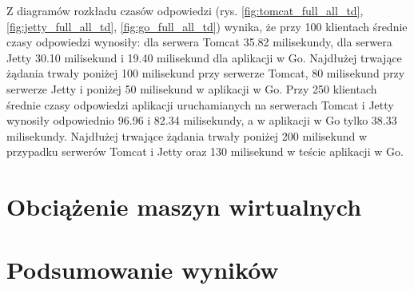 Z diagramów rozkładu czasów odpowiedzi (rys. \ref{fig:tomcat_full_all_td}, \ref{fig:jetty_full_all_td}, \ref{fig:go_full_all_td}) wynika, że przy 100 klientach średnie czasy odpowiedzi wynosiły: dla serwera Tomcat 35.82 milisekundy, dla serwera Jetty 30.10 milisekund i 19.40 milisekund dla aplikacji w Go. Najdłużej trwające żądania trwały poniżej 100 milisekund przy serwerze Tomcat, 80 milisekund przy serwerze Jetty i  poniżej 50 milisekund  w aplikacji w Go. Przy 250 klientach średnie czasy odpowiedzi aplikacji uruchamianych na serwerach Tomcat  i Jetty   wynosiły odpowiednio 96.96 i 82.34 milisekundy, a w aplikacji w Go tylko 38.33 milisekundy. Najdłużej trwające żądania trwały poniżej 200 milisekund w przypadku serwerów Tomcat i Jetty oraz 130 milisekund w teście aplikacji w Go. 


\clearpage

\section{Obciążenie maszyn wirtualnych}

\newpage
\section{Podsumowanie wyników}
